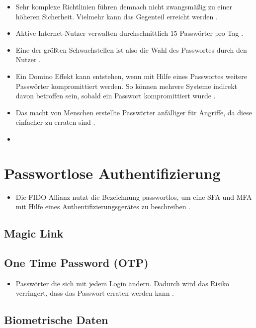 \begin{itemize}
    \item Sehr komplexe Richtlinien führen demnach nicht zwangsmäßig zu einer höheren Sicherheit. Vielmehr kann das Gegenteil erreicht werden \cite{yildirim2019encouraging} \cite{morii2017research}.
    \item Aktive Internet-Nutzer verwalten durchschnittlich 15 Passwörter pro Tag \cite{ives2004domino}.
    \item Eine der größten Schwachstellen ist also die Wahl des Passwortes durch den Nutzer \cite{boonkrong2012security}.
    \item Ein Domino Effekt kann entstehen, wenn mit Hilfe eines Passwortes weitere Passwörter kompromittiert werden. So können mehrere Systeme indirekt davon betroffen sein, sobald ein Passwort kompromittiert wurde \cite{ives2004domino}.
    \item Das macht von Menschen erstellte Passwörter anfälliger für Angriffe, da diese einfacher zu erraten sind \cite{chanda2016password}.
    \item 
\end{itemize}

\section{Passwortlose Authentifizierung}

\begin{itemize}
    \item Die \ac{FIDO} Allianz nutzt die Bezeichnung passwortlos, um eine \ac{SFA} und \ac{MFA} mit Hilfe eines Authentifizierungsgerätes zu beschreiben \cite{farke2020you}.
\end{itemize}

\subsection{Magic Link}

\subsection{One Time Password (OTP)}
\begin{itemize}
    \item Passwörter die sich mit jedem Login ändern. Dadurch wird das Risiko verringert, dass das Passwort erraten werden kann \cite{boonkrong2012security}.
\end{itemize}

\subsection{Biometrische Daten}

